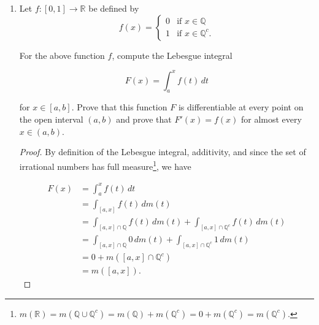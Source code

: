 \documentclass[11pt,oneside,english]{amsart}
\theoremstyle{definition}
\newcommand{\aspace}{\hspace{7mm}\text{and}\hspace{7mm}}
\newcommand{\dd}[2]{\frac{d{#1}}{d{#2}}}
\newcommand{\MC}[1]{\mathcal{#1}}
\newcommand{\MB}[1]{\mathbb{#1}}
\begin{document}
\begin{enumerate}
\begin{proof}
Let $\mu,\nu,\lambda$ be $\sigma$-finite measures on a measurable space $(X,\MC{M})$, and suppose that $\lambda\ll\mu$ and $\nu\ll\mu$. Let the measure $a\nu+b\lambda$ be as defined above with $a,b\geq0$. First, for $E\in\MC{M}$, if $\mu(E)=0$, then by absolute continuity we have $\lambda(E)=0$ and $\nu(E)=0$ as well. Furthermore, we have that $a\nu(E)=a\cdot0=0$ and $b\lambda(E)=b\cdot0=0$, whence $a\nu(E)+b\lambda(E)=0$ when $\mu(E)=0$. Thus, by definition, $a\nu+b\lambda\ll\mu$.

Now, by the Radon-Nikodym theorem, we have $d\lambda=\dd{\lambda}{\mu}\,d\mu$ and $d\nu=\dd{\nu}{\mu}\,d\mu$ so for any $E\in\MC{M}$ we have

\[
\lambda(E)=\int_E\dd{\lambda}{\mu}\,d\mu\aspace\nu(E)=\int_E\dd{\nu}{\mu}\,d\mu.
\]

Consequently,
\begin{align*}
a\lambda(E)+b\nu(E)&=a\int_E\dd{\lambda}{\mu}\,d\mu+b\int_E\dd{\nu}{\mu}\,d\mu\\[2mm]
&=\int_E\left(a\dd{\lambda}{\mu}+b\dd{\nu}{\mu}\right)\,d\mu,
\end{align*}

so by definition, $\displaystyle \dd{(a\nu+b\lambda)}{\mu}=a\dd{\nu}{\mu}+b\dd{\lambda}{\mu}$ \hspace{5mm}$\mu$-a.e.
\end{proof}
\vfill
\pagebreak


\item Let $f:[0,1]\rightarrow \MB{R}$ be defined by
\[
f(x)=\begin{cases}0 & \text{if }x\in\mathbb{Q}\\ 1 & \text{if }x\in\MB{Q}^c.\end{cases}
\]

For the above function $f$, compute the Lebesgue integral 

\[
F(x)=\int_a^xf(t)\,dt
\]

for $x\in[a,b]$. Prove that this function $F$ is differentiable at every point on the open interval $(a,b)$ and prove that $F'(x)=f(x)$ for almost every $x\in(a,b)$.

\begin{proof}
By definition of the Lebesgue integral, additivity, and since the set of irrational numbers has full measure\footnote{
$m(\MB{R})=m(\MB{Q}\cup\MB{Q}^c)=m(\MB{Q})+m(\MB{Q}^c)=0+m(\MB{Q}^c)=m(\MB{Q}^c).$}, we have

\begin{align*}
F(x)&=\int_a^xf(t)\,dt\\[2mm]
&=\int_{[a,x]}f(t)\,dm(t)\\[2mm]
&=\int_{[a,x]\cap\MB{Q}}f(t)\,dm(t)+\int_{[a,x]\cap\MB{Q}^c}f(t)\,dm(t)\\[2mm]
&=\int_{[a,x]\cap\MB{Q}}0\,dm(t)+\int_{[a,x]\cap\MB{Q}^c}1\,dm(t)\\[2mm]
&=0+m([a,x]\cap\MB{Q}^c)\\[2mm]
&=m([a,x]).
\end{align*}


\end{proof}
\end{enumerate}
\end{document}
